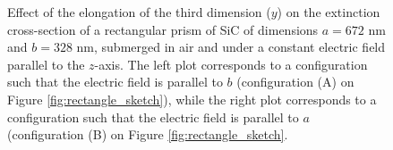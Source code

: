 \begin{figure}
    \centering
    \caption{Effect of the elongation of the third dimension ($y$) on the 
        extinction cross-section of a rectangular prism of SiC of dimensions $a=672$ nm 
        and $b=328$ nm, submerged in air and under a constant electric field 
        parallel to the $z$-axis. The left plot corresponds to a configuration such that the electric 
        field is parallel to $b$ (configuration (A) on Figure \ref{fig:rectangle_sketch}), while the 
        right plot corresponds to a configuration such that the electric field is 
        parallel to $a$ (configuration (B) on Figure \ref{fig:rectangle_sketch}.}
    \label{fig:ext_y_14}   
 \end{figure}

